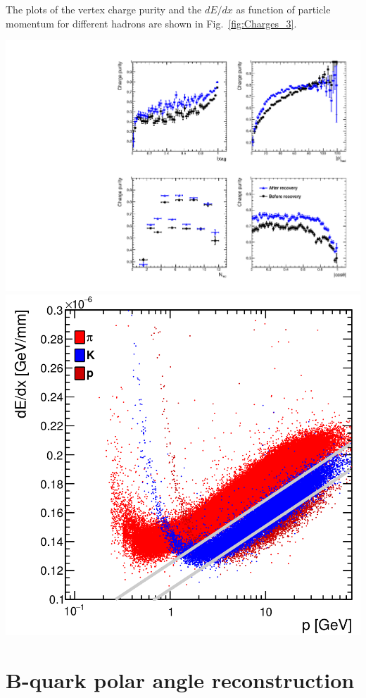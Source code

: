 \documentclass[a0,portrait]{a0poster}
\begin{document}
\begin{multicols}{2}
The plots of the vertex charge purity and the $dE/dx$ as function of particle momentum for different hadrons are shown in Fig.~\ref{fig:Charges_3}.
\begin{center}\vspace{1cm}
	\label{fig:Charges_3}
	\includegraphics[clip, trim=10cm 0cm 0cm 10cm,width=0.4\linewidth]{../ILD/plots/recovery-purity-comparison.pdf}\label{fig:Charges_a_3}
	\includegraphics[width=0.37\linewidth]{plots/dedx.png}\label{fig:Charges_b_3}
\end{center}\vspace{1cm}





\section*{B-quark polar angle reconstruction}



\end{multicols}
\end{document}
